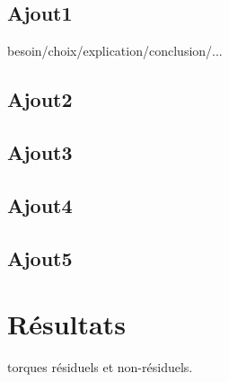 % 
        

        \section{Ajout1}
besoin/choix/explication/conclusion/...
        \section{Ajout2}
        \section{Ajout3}
        \section{Ajout4}
        
        \section{Ajout5}

    \chapter{Résultats}



torques résiduels et non-résiduels.
    
    
